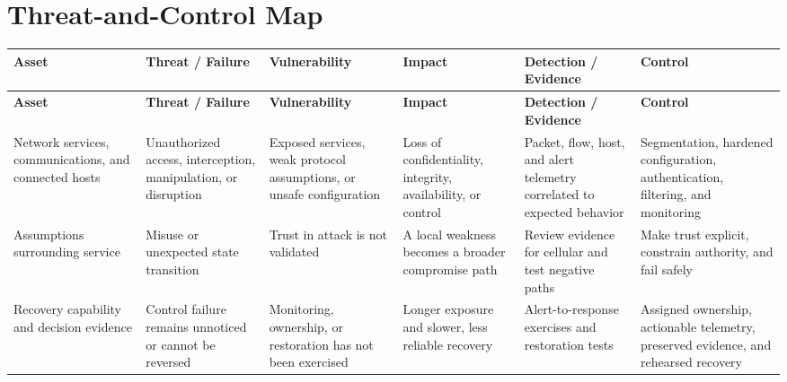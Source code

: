 \documentclass[11pt,letterpaper]{article}
\begin{document}
\section*{Threat-and-Control Map}
\begingroup\scriptsize\setlength{\tabcolsep}{2pt}
\begin{longtable}{>{\raggedright\arraybackslash}p{}>{\raggedright\arraybackslash}p{}>{\raggedright\arraybackslash}p{}>{\raggedright\arraybackslash}p{}>{\raggedright\arraybackslash}p{}>{\raggedright\arraybackslash}p{}}
\toprule\rowcolor{Navy}\color{white}\textbf{Asset} & \color{white}\textbf{Threat / Failure} & \color{white}\textbf{Vulnerability} & \color{white}\textbf{Impact} & \color{white}\textbf{Detection / Evidence} & \color{white}\textbf{Control}\\\midrule
\endfirsthead
\toprule\rowcolor{Navy}\color{white}\textbf{Asset} & \color{white}\textbf{Threat / Failure} & \color{white}\textbf{Vulnerability} & \color{white}\textbf{Impact} & \color{white}\textbf{Detection / Evidence} & \color{white}\textbf{Control}\\\midrule
\endhead
Network services, communications, and connected hosts & Unauthorized access, interception, manipulation, or disruption & Exposed services, weak protocol assumptions, or unsafe configuration & Loss of confidentiality, integrity, availability, or control & Packet, flow, host, and alert telemetry correlated to expected behavior & Segmentation, hardened configuration, authentication, filtering, and monitoring\\\midrule
Assumptions surrounding service & Misuse or unexpected state transition & Trust in attack is not validated & A local weakness becomes a broader compromise path & Review evidence for cellular and test negative paths & Make trust explicit, constrain authority, and fail safely\\\midrule
Recovery capability and decision evidence & Control failure remains unnoticed or cannot be reversed & Monitoring, ownership, or restoration has not been exercised & Longer exposure and slower, less reliable recovery & Alert-to-response exercises and restoration tests & Assigned ownership, actionable telemetry, preserved evidence, and rehearsed recovery\\\midrule
\bottomrule
\end{longtable}
\endgroup
\end{document}

